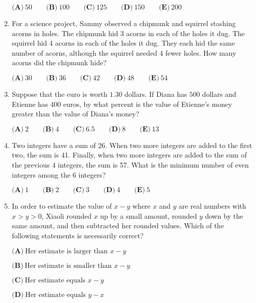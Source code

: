 \documentclass{article}
\begin{document}
\begin{enumerate}[label=\arabic*., itemsep=0.5em]
\(\textbf{(A)}\ 50\qquad\textbf{(B)}\ 100\qquad\textbf{(C)}\ 125\qquad\textbf{(D)}\ 150\qquad\textbf{(E)}\ 200\)\par \vspace{0.5em}\item For a science project, Sammy observed a chipmunk and squirrel stashing acorns in holes. The chipmunk hid 3 acorns in each of the holes it dug. The squirrel hid 4 acorns in each of the holes it dug. They each hid the same number of acorns, although the squirrel needed 4 fewer holes. How many acorns did the chipmunk hide? 

\(\textbf{(A)}\ 30\qquad\textbf{(B)}\ 36\qquad\textbf{(C)}\ 42\qquad\textbf{(D)}\ 48\qquad\textbf{(E)}\ 54\)\par \vspace{0.5em}\item Suppose that the euro is worth \(1.30\) dollars. If Diana has \(500\) dollars and Etienne has \(400\) euros, by what percent is the value of Etienne's money greater than the value of Diana's money?

\(\textbf{(A)}\ 2\qquad\textbf{(B)}\ 4\qquad\textbf{(C)}\ 6.5\qquad\textbf{(D)}\ 8\qquad\textbf{(E)}\ 13\)\par \vspace{0.5em}\item Two integers have a sum of 26. When two more integers are added to the first two, the sum is 41. Finally, when two more integers are added to the sum of the previous 4 integers, the sum is 57. What is the minimum number of even integers among the 6 integers? 

\(\textbf{(A)}\ 1\qquad\textbf{(B)}\ 2\qquad\textbf{(C)}\ 3\qquad\textbf{(D)}\ 4\qquad\textbf{(E)}\ 5\)\par \vspace{0.5em}\item In order to estimate the value of \(x-y\) where \(x\) and \(y\) are real numbers with \(x > y > 0\), Xiaoli rounded \(x\) up by a small amount, rounded \(y\) down by the same amount, and then subtracted her rounded values. Which of the following statements is necessarily correct?

\(\textbf{(A)}\ \text{Her estimate is larger than }x-y\)

\(\textbf{(B)}\ \text{Her estimate is smaller than }x-y\)

\(\textbf{(C)}\ \text{Her estimate equals }x-y\)

\(\textbf{(D)}\ \text{Her estimate equals }y - x\)


\end{enumerate}
\end{document}
